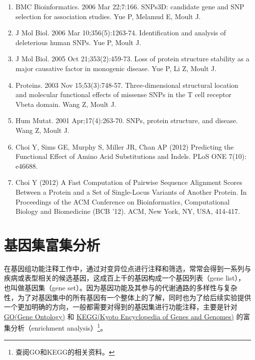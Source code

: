 \documentclass[11pt,a4paper,twoside]{book}
\begin{document}
{{\begin{enumerate}
  \item BMC Bioinformatics. 2006 Mar 22;7:166. SNPs3D: candidate gene and SNP selection for association studies. Yue P, Melamud E, Moult J.
  \item J Mol Biol. 2006 Mar 10;356(5):1263-74. Identification and analysis of deleterious human SNPs. Yue P, Moult J.
  \item J Mol Biol. 2005 Oct 21;353(2):459-73. Loss of protein structure stability as a major causative factor in monogenic disease. Yue P, Li Z, Moult J.
  \item Proteins. 2003 Nov 15;53(3):748-57. Three-dimensional structural location and molecular functional effects of missense SNPs in the T cell receptor Vbeta domain. Wang Z, Moult J.
  \item Hum Mutat. 2001 Apr;17(4):263-70. SNPs, protein structure, and disease. Wang Z, Moult J.
  \item Choi Y, Sims GE, Murphy S, Miller JR, Chan AP (2012) Predicting the Functional Effect of Amino Acid Substitutions and Indels. PLoS ONE 7(10): e46688.
  \item Choi Y (2012) A Fast Computation of Pairwise Sequence Alignment Scores Between a Protein and a Set of Single-Locus Variants of Another Protein. In Proceedings of the ACM Conference on Bioinformatics, Computational Biology and Biomedicine (BCB '12). ACM, New York, NY, USA, 414-417.
\end{enumerate}
}}

\section{基因集富集分析}
在基因组功能注释工作中，通过对变异位点进行注释和筛选，常常会得到一系列与疾病或表型相关的候选基因，这成百上千的基因构成一个基因列表（gene list），也叫做基因集（gene set）。因为基因功能及其参与的代谢通路的多样性与复杂性，为了对基因集中的所有基因有一个整体上的了解，同时也为了给后续实验提供一个更加明确的方向，一般都需要对得到的基因集进行功能注释，主要是针对 \href{http://www.geneontology.org}{GO(Gene Ontology)} 和 \href{http://www.genome.jp/kegg}{KEGG(Kyoto Encyclopedia of Genes and Genomes)} 的富集分析（enrichment analysis）\footnote{查阅GO和KEGG的相关资料。}。
\end{document}
